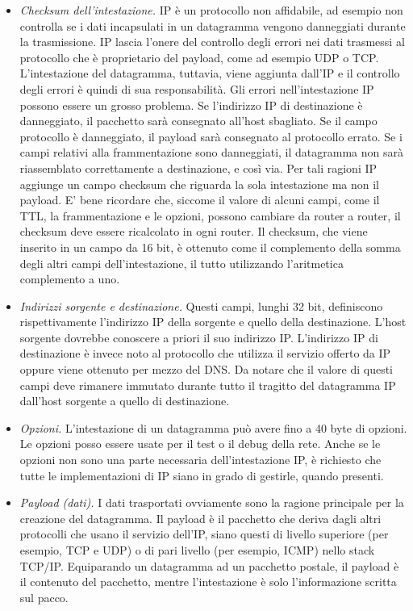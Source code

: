 \begin{itemize}
    \item \textit{Checksum dell'intestazione.} IP è un protocollo non affidabile, ad esempio non controlla se i dati incapsulati in un datagramma vengono danneggiati durante la trasmissione. IP lascia l'onere del controllo degli errori nei dati trasmessi al protocollo che è proprietario del payload, come ad esempio UDP o TCP. L'intestazione del datagramma, tuttavia, viene aggiunta dall'IP e il controllo degli errori è quindi di sua responsabilità. Gli errori nell'intestazione IP possono essere un grosso problema. Se l'indirizzo IP di destinazione è danneggiato, il pacchetto sarà consegnato all'host sbagliato. Se il campo protocollo è danneggiato, il payload sarà consegnato al protocollo errato. Se i campi relativi alla frammentazione sono danneggiati, il datagramma non sarà riassemblato correttamente a destinazione, e così via. Per tali ragioni IP aggiunge un campo checksum che riguarda la sola intestazione ma non il payload. E' bene ricordare che, siccome il valore di alcuni campi, come il TTL, la frammentazione e le opzioni, possono cambiare da router a router, il checksum deve essere ricalcolato in ogni router. Il checksum, che viene inserito in un campo da 16 bit, è ottenuto come il complemento della somma degli altri campi dell'intestazione, il tutto utilizzando l'aritmetica complemento a uno.
    \item \textit{Indirizzi sorgente e destinazione.} Questi campi, lunghi 32 bit, definiscono rispettivamente l'indirizzo IP della sorgente e quello della destinazione. L'host sorgente dovrebbe conoscere a priori il suo indirizzo IP. L'indirizzo IP di destinazione è invece noto al protocollo che utilizza il servizio offerto da IP oppure viene ottenuto per mezzo del DNS. Da notare che il valore di questi campi deve rimanere immutato durante tutto il tragitto del datagramma IP dall'host sorgente a quello di destinazione.
    \item \textit{Opzioni.} L'intestazione di un datagramma può avere fino a 40 byte di opzioni. Le opzioni posso essere usate per il test o il debug della rete. Anche se le opzioni non sono una parte necessaria dell'intestazione IP, è richiesto che tutte le implementazioni di IP siano in grado di gestirle, quando presenti.
    \item \textit{Payload (dati).} I dati trasportati ovviamente sono la ragione principale per la creazione del datagramma. Il payload è il pacchetto che deriva dagli altri protocolli che usano il servizio dell'IP, siano questi di livello superiore (per esempio, TCP e UDP) o di pari livello (per esempio, ICMP) nello stack TCP/IP. Equiparando un datagramma ad un pacchetto postale, il payload è il contenuto del pacchetto, mentre l'intestazione è solo l'informazione scritta sul pacco.
\end{itemize}

